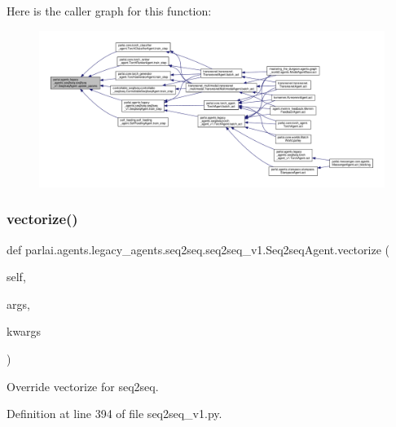 Here is the caller graph for this function\+:
\nopagebreak
\begin{figure}[H]
\begin{center}
\leavevmode
\includegraphics[width=350pt]{classparlai_1_1agents_1_1legacy__agents_1_1seq2seq_1_1seq2seq__v1_1_1Seq2seqAgent_a3fabaacec11534b452a1786d3dd5a6c8_icgraph}
\end{center}
\end{figure}
\mbox{\label{classparlai_1_1agents_1_1legacy__agents_1_1seq2seq_1_1seq2seq__v1_1_1Seq2seqAgent_ae0e5663a7879b2704378dfe99ef6d0f4}} 
\subsubsection{\texorpdfstring{vectorize()}{vectorize()}}
{\footnotesize\ttfamily def parlai.\+agents.\+legacy\+\_\+agents.\+seq2seq.\+seq2seq\+\_\+v1.\+Seq2seq\+Agent.\+vectorize (\begin{DoxyParamCaption}\item[{}]{self,  }\item[{}]{args,  }\item[{}]{kwargs }\end{DoxyParamCaption})}

\begin{DoxyVerb}Override vectorize for seq2seq.\end{DoxyVerb}
 

Definition at line 394 of file seq2seq\+\_\+v1.\+py.



